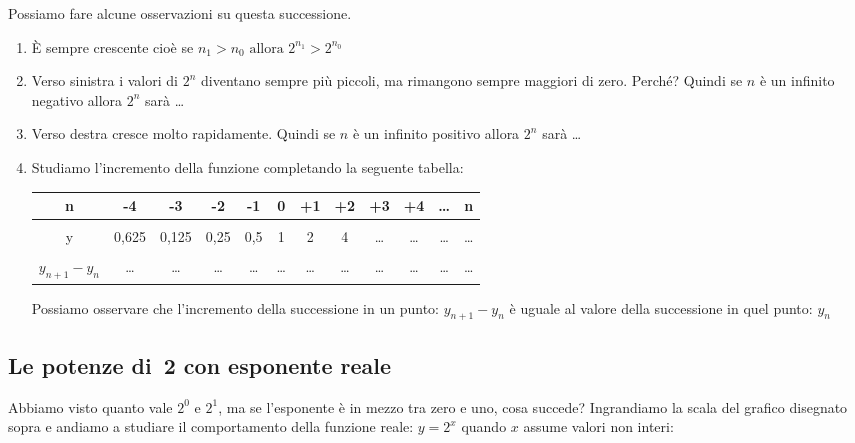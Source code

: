 \begin{osservazione}
Possiamo fare alcune osservazioni su questa successione.

\begin{enumerate}
 \item 
  È sempre crescente cioè se \(n_1 > n_0 \text{ allora } 2^{n_1} > 2^{n_0}\)
 \item 
  Verso sinistra i valori di \(2^n\) diventano sempre più piccoli, ma rimangono 
  sempre maggiori di zero. Perché? Quindi se \(n\) è un infinito negativo 
  allora \(2^n\) sarà \dots
 \item 
  Verso destra cresce molto rapidamente. Quindi se \(n\) è un infinito positivo 
  allora \(2^n\) sarà \dots
 \item 
  Studiamo l'incremento della funzione completando la seguente tabella:
  
\begin{center}
\begin{tabular}{cccccccccccc}
n & -4    & -3    & -2   & -1  & 0 & +1 & +2 & +3    & +4    & \dots & n\\
\hline \\
y & 0,625 & 0,125 & 0,25 & 0,5 & 1 & 2  & 4  & \dots & \dots & \dots & \dots\\
\hline \\
\(y_{n+1} - y_n\) & 
    \dots & \dots & \dots & \dots & \dots & \dots  & \dots  & \dots & \dots & 
\dots & \dots\\
\end{tabular}
\end{center}

  Possiamo osservare che l'incremento della successione in un punto: 
  \(y_{n+1} - y_n\) 
  è uguale al valore della successione in quel punto: 
  \(y_n\) 

\end{enumerate}
\end{osservazione}

\subsection{Le potenze di~2 con esponente reale}
\label{subsec:esplog_potdue}

Abbiamo visto quanto vale \(2^0\) e \(2^1\), ma se l'esponente è in mezzo 
tra zero e uno, cosa succede? Ingrandiamo la scala del grafico disegnato sopra 
e andiamo a studiare il comportamento della funzione reale: \(y=2^x\) quando 
\(x\) assume valori non interi:

